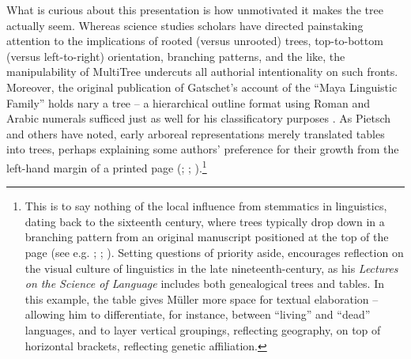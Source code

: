 \documentclass[output=paper]{langscibook}
\begin{document}
What is curious about this presentation is how unmotivated it makes the tree actually seem. Whereas science studies scholars have directed painstaking attention to the implications of rooted (versus unrooted) trees, top-to-bottom (versus left-to-right) orientation, branching patterns, and the like, the manipulability of MultiTree undercuts all authorial intentionality on such fronts. Moreover, the original publication of Gatschet's account of the ``Maya Linguistic Family'' holds nary a tree -- a hierarchical outline format using Roman and Arabic numerals sufficed just as well for his classificatory purposes \citep[250--251]{GatschetCampbell1973}. As Pietsch and others have noted, early arboreal representations merely translated tables into trees, perhaps explaining some authors' preference for their growth from the left-hand margin of a printed page (\citealt[51]{Wells1987}; \citealt[7--10]{Pietsch2012}; \citealt[57]{Archibald2014}).\footnote{This is to say nothing of the local influence from stemmatics in linguistics, dating back to the sixteenth century, where trees typically drop down in a branching pattern from an original manuscript positioned at the top of the page (see e.g. \citealt{Maher1966}; \citealt{Hoenigswald1975}; \citealt{Cameron1987}). Setting questions of priority aside, \citet[vol. I, 537]{Mueller19131891} encourages reflection on the visual culture of linguistics in the late nineteenth-century, as his \emph{Lectures on the Science of Language} includes both genealogical trees and tables. In this example, the table gives Müller more space for textual elaboration -- allowing him to differentiate, for instance, between ``living'' and ``dead'' languages, and to layer vertical groupings, reflecting geography, on top of horizontal brackets, reflecting genetic affiliation.}
\end{document}
